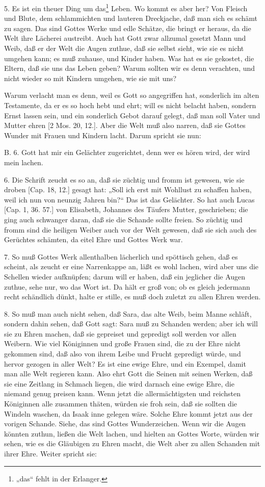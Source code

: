 5. Es ist ein theuer Ding um das\footnote{„das“ fehlt in der Erlanger.} Leben. Wo kommt es aber her? Von Fleisch und Blute, dem schlammichten und lauteren Dreckjache, daß man sich es schämt zu sagen. Das sind Gottes Werke und edle Schätze, die bringt er heraus, da die Welt ihre Lächerei austreibt. Auch hat Gott zwar allzumal gesetzt Mann und Weib, daß er der Welt die Augen zuthue, daß sie selbst sieht, wie sie es nicht umgehen kann; es muß zuhause, und Kinder haben. Was hat es sie gekostet, die Eltern, daß sie uns das Leben geben? Warum sollten wir es denn verachten, und nicht wieder so mit Kindern umgehen, wie sie mit uns?

Warum verlacht man es denn, weil es Gott so angegriffen hat, sonderlich im alten Testamente, da er es so hoch hebt und ehrt; will es nicht belacht haben, sondern Ernst lassen sein, und ein sonderlich Gebot darauf gelegt, daß man soll Vater und Mutter ehren [2 Mos. 20, 12.]. Aber die Welt muß also narren, daß sie Gottes Wunder mit Frauen und Kindern lacht. Darum spricht sie nun:

B. 6. Gott hat mir ein Gelächter zugerichtet, denn wer es hören wird, der wird mein lachen.

6. Die Schrift zeucht es so an, daß sie züchtig und fromm ist gewesen, wie sie droben [Cap. 18, 12.] gesagt hat: „Soll ich erst mit Wohllust zu schaffen haben, weil ich nun von neunzig Jahren bin?“ Das ist das Gelächter. So hat auch Lucas [Cap. 1, 36. 57.] von Elisabeth, Johannes des Täufers Mutter, geschrieben; die ging auch schwanger daran, daß sie die Schande sollte freien. So züchtig und fromm sind die heiligen Weiber auch vor der Welt gewesen, daß sie sich auch des Gerüchtes schämten, da eitel Ehre und Gottes Werk war.

7. So muß Gottes Werk allenthalben lächerlich und spöttisch gehen, daß es scheint, als zeucht er eine Narrenkappe an, läßt es wohl lachen, wird aber uns die Schellen wieder aufknüpfen; darum will er haben, daß ein jeglicher die Augen zuthue, sehe nur, wo das Wort ist. Da hält er groß von; ob es gleich jedermann recht schändlich dünkt, halte er stille, es muß doch zuletzt zu allen Ehren werden.

8. So muß man auch nicht sehen, daß Sara, das alte Weib, beim Manne schläft, sondern dahin sehen, daß Gott sagt: Sara muß zu Schanden werden; aber ich will sie zu Ehren machen, daß sie gepreiset und gepredigt soll werden vor allen Weibern. Wie viel Königinnen und große Frauen sind, die zu der Ehre nicht gekommen sind, daß also von ihrem Leibe und Frucht gepredigt würde, und hervor gezogen in aller Welt? Es ist eine ewige Ehre, und ein Exempel, damit man alle Welt regieren kann. Also ehrt Gott die Seinen mit seinen Werken, daß sie eine Zeitlang in Schmach liegen, die wird darnach eine ewige Ehre, die niemand genug preisen kann. Wenn jetzt die allermächtigsten und reichsten Königinnen alle zusammen thäten, würden sie froh sein, daß sie sollten die Windeln waschen, da Isaak inne gelegen wäre.
Solche Ehre kommt jetzt aus der vorigen Schande. Siehe, das sind Gottes Wunderzeichen. Wenn wir die Augen könnten zuthun, ließen die Welt lachen, und hielten an Gottes Worte, würden wir sehen, wie es die Gläubigen zu Ehren macht, die Welt aber zu allen Schanden mit ihrer Ehre. Weiter spricht sie:

